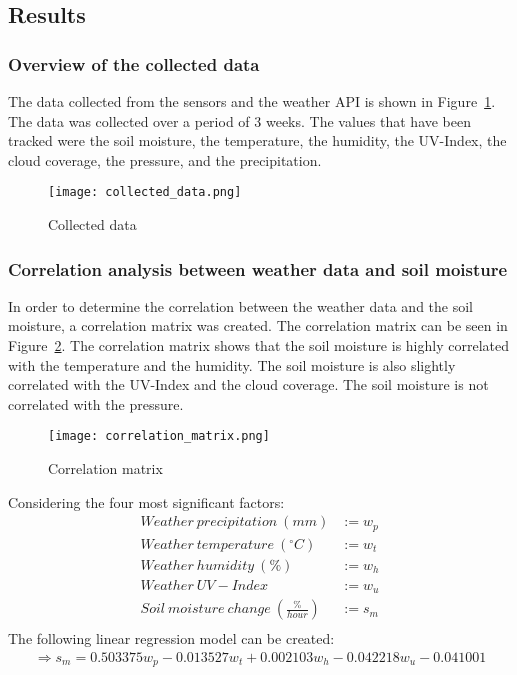 \documentclass[11pt]{scrartcl} %
\begin{document}
\subsection{Results}
\subsubsection{Overview of the collected data}
The data collected from the sensors and the weather API is shown in Figure~\ref{fig:collected_data}. The data was collected over a period of 3 weeks. The values that have been tracked were the soil moisture, the temperature, the humidity, the UV-Index, the cloud coverage, the pressure, and the precipitation.
\begin{figure}[h]
	\centering
	\texttt{[image: collected\_data.png]}
	\caption{Collected data}
	\label{fig:collected_data}
\end{figure}

\subsubsection{Correlation analysis between weather data and soil moisture}
In order to determine the correlation between the weather data and the soil moisture, a correlation matrix was created. The correlation matrix can be seen in Figure~\ref{fig:correlation_matrix}. The correlation matrix shows that the soil moisture is highly correlated with the temperature and the humidity. The soil moisture is also slightly correlated with the UV-Index and the cloud coverage. The soil moisture is not correlated with the pressure.
\begin{figure}[h]
	\centering
	\texttt{[image: correlation\_matrix.png]}
	\caption{Correlation matrix}
	\label{fig:correlation_matrix}
\end{figure}
\newline Considering the four most significant factors:
\begin{equation*}
	\begin{aligned}
		Weather\ precipitation\ (mm)              & := w_p \\
		Weather\ temperature\ (^{\circ} C)        & := w_t \\
		Weather\ humidity\ (\%)                   & := w_h \\
		Weather\ UV-Index                         & := w_u \\
		Soil\ moisture\ change\ (\frac{\%}{hour}) & := s_m \\
	\end{aligned}
\end{equation*}
\newline The following linear regression model can be created:
\begin{equation*}
	\begin{aligned}
		\Rightarrow s_m = 0.503375w_p -0.013527w_t + 0.002103w_h -0.042218w_u -0.041001
	\end{aligned}
\end{equation*}
\end{document}
